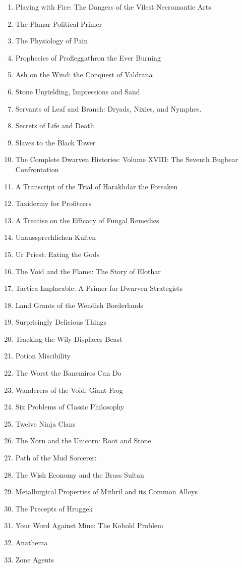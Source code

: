 \begin{enumerate}
	\item Playing with Fire: The Dangers of the Vilest Necromantic Arts
	\item The Planar Political Primer
	\item The Physiology of Pain
	\item Prophecies of Profleggathron the Ever Burning
	\item Ash on the Wind: the Conquest of Valdrana
	\item Stone Unyielding, Impressions and Sand
	\item Servants of Leaf and Branch: Dryads, Nixies, and Nymphes.
	\item Secrets of Life and Death
	\item Slaves to the Black Tower
	\item The Complete Dwarven Histories: Volume XVIII: The Seventh Bugbear Confrontation
	\item A Transcript of the Trial of Harakhdar the Forsaken
	\item Taxidermy for Profiteers
	\item A Treatise on the Efficacy of Fungal Remedies
	\item Unaussprechlichen Kulten
	\item Ur Priest: Eating the Gods
	\item The Void and the Flame: The Story of Elothar
	\item Tactica Implacable: A Primer for Dwarven Strategists
	\item Land Grants of the Wendish Borderlands
	\item Surprisingly Delicious Things
	\item Tracking the Wily Displacer Beast
	\item Potion Miscibility
	\item The Worst the Banemires Can Do
	\item Wanderers of the Void: Giant Frog
	\item Six Problems of Classic Philosophy
	\item Twelve Ninja Clans
	\item The Xorn and the Unicorn: Root and Stone
	\item Path of the Mud Sorcerer:
	\item The Wish Economy and the Brass Sultan
	\item Metallurgical Properties of Mithril and its Common Alloys
	\item The Precepts of Hruggek
	\item Your Word Against Mine: The Kobold Problem
	\item Anathema
	\item Zone Agents
\end{enumerate}

